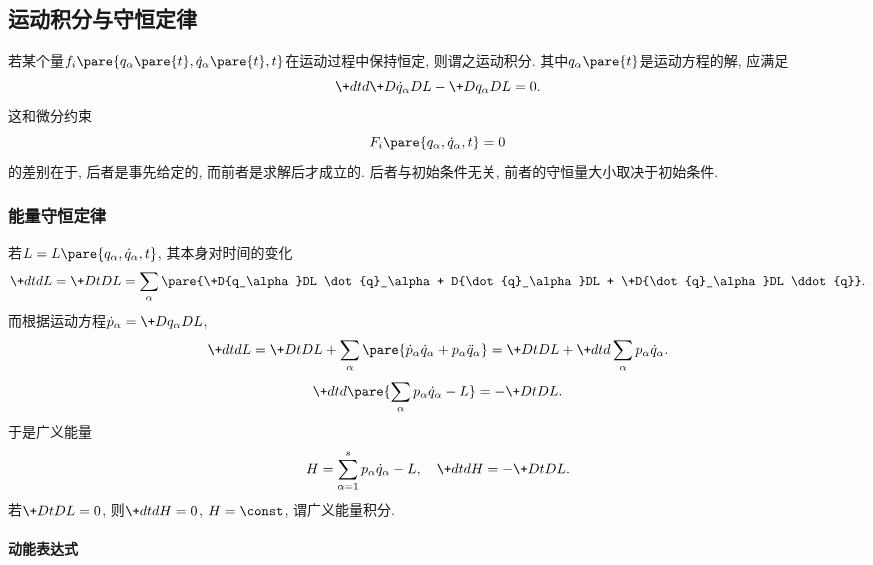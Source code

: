 \documentclass{ctexart}
\begin{document}

\subsection{运动积分与守恒定律} %
\label{sub:运动积分与守恒定律}

若某个量$f_i\pare{q_\alpha\pare{t},\dot{q}_\alpha\pare{t},t}$在运动过程中保持恒定, 则谓之运动积分. 其中$q_\alpha\pare{t}$是运动方程的解, 应满足
\[ \+dtd{}\+D{\dot{q}_\alpha}DL - \+D{q_\alpha}DL = 0. \]
这和微分约束
\[ F_i\pare{q_\alpha,\dot{q}_\alpha,t} = 0 \]
的差别在于, 后者是事先给定的, 而前者是求解后才成立的. 后者与初始条件无关, 前者的守恒量大小取决于初始条件.

\subsubsection{能量守恒定律} %
\label{ssub:能量守恒定律}

若$L = L\pare{q_\alpha,\dot{q}_\alpha,t}$, 其本身对时间的变化
\[ \+dtdL = \+DtDL = \sum_\alpha\pare{\+D{q_\alpha}DL \dot{q}_\alpha + D{\dot{q}_\alpha}DL + \+D{\dot{q}_\alpha}DL \ddot{q}}. \]
而根据运动方程$\dot{p}_\alpha = \displaystyle \+D{q_\alpha}DL$,
\[ \+dtdL = \+DtDL + \sum_{\alpha} \pare{\dot{p}_\alpha \dot{q}_\alpha + p_\alpha \ddot{q}_\alpha} = \+DtDL + \+dtd{}\sum_\alpha p_\alpha \dot{q}_\alpha. \]
\[ \+dtd{}\pare{\sum_\alpha p_\alpha\dot{q}_\alpha - L} = -\+DtDL. \]
于是广义能量
\[ H = \sum_{\alpha = 1}^s p_\alpha\dot{q}_\alpha  - L, \quad \+dtdH = -\+DtDL. \]
若$\displaystyle \+DtDL = 0$, 则$\displaystyle \+dtdH = 0$, $H=\const$, 谓广义能量积分.

\paragraph{动能表达式} %
\label{par:动能表达式}
\end{document}
